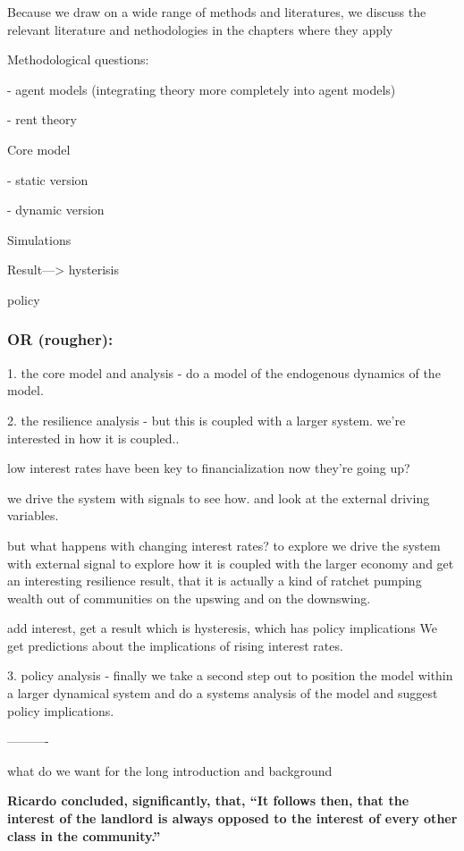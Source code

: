 \color{red}
Because we draw on a wide range of methods and literatures, we discuss the relevant literature and  nethodologies in the chapters where they apply 

\color{black}


Methodological questions: 

    - agent models (integrating theory more completely into agent models)
    
    - rent theory

Core model

    - static version
    
    - dynamic version

Simulations

Result---> hysterisis

policy

\subsubsection{OR (rougher):}

1. the core model and analysis - do a model of the endogenous dynamics of the model.

2. the resilience analysis -
but this is coupled with a larger system. we're interested in how it is coupled..

low interest rates have been key to financialization 
now they're going up?

we drive the system with signals to see how. and look at the external driving variables.

but what happens with changing interest rates? to explore we drive the system with external signal to explore how it is coupled with the larger economy and get an interesting resilience result, that it is actually a kind of ratchet pumping wealth out of communities on the upswing and on the downswing.

add interest, get a result which is hysteresis, which has policy implications
We get predictions about the implications of rising interest rates.

3.  policy analysis - finally we take a second step out to position the model within a larger dynamical system and do a systems analysis of the model and suggest policy implications. 

----------

what do we want for the long introduction and background

\textbf{Ricardo concluded, significantly, that, ``It follows then, that the interest of the landlord is always opposed to the interest of every other class in the community.'' }


